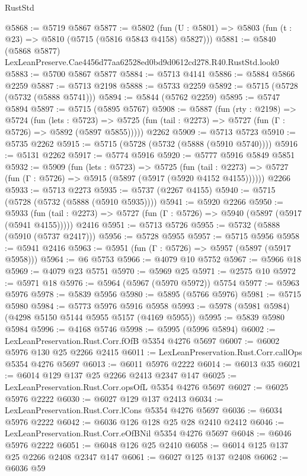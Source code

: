 \begin{lexlean}{RustStd}
\begin{coremodule}
@5868 := @5719 @5867
@5877 := @5802 (fun (U : @5801) => @5803 (fun (t : @23) => @5810 (@5715 (@5816 @5843 @4158) @5827)))
@5881 := @5840 (@5868 @5877) LexLeanPreserve.Cae4456d77aa62528ed0bd9d0612cd278.R40.RustStd.look0
@5883 := @5700 @5867 @5877
@5884 := @5713 @4141
@5886 := @5884 @5866 @2259
@5887 := @5713 @2198
@5888 := @5733 @2259
@5892 := @5715 (@5728 (@5732 (@5888 @5741)))
@5894 := @5844 (@5762 @2259)
@5895 := @5747 @5894
@5897 := @5715 (@5895 @5767)
@5908 := @5887
    (fun (rty : @2198) =>
    @5724
      (fun (lets : @5723) =>
      @5725 (fun (tail : @2273) => @5727 (fun (Γ : @5726) => @5892 (@5897 @5855)))))
    @2262
@5909 := @5713 @5723
@5910 := @5735 @2262
@5915 := @5715 (@5728 (@5732 (@5888 (@5910 @5740))))
@5916 := @5131 @2262
@5917 := @5774 @5916
@5920 := @5777 @5916 @5849 @5851
@5932 := @5909
    (fun (lets : @5723) =>
    @5725
      (fun (tail : @2273) => @5727 (fun (Γ : @5726) => @5915 (@5897 (@5917 (@5920 @4152 @4155))))))
    @2266
@5933 := @5713 @2273
@5935 := @5737 (@2267 @4155)
@5940 := @5715 (@5728 (@5732 (@5888 (@5910 @5935))))
@5941 := @5920 @2266
@5950 := @5933
    (fun (tail : @2273) => @5727 (fun (Γ : @5726) => @5940 (@5897 (@5917 (@5941 @4155)))))
    @2416
@5951 := @5713 @5726
@5955 := @5732 (@5888 (@5910 (@5737 @2417)))
@5956 := @5728 @5955
@5957 := @5715 @5956
@5958 := @5941 @2416
@5963 := @5951 (fun (Γ : @5726) => @5957 (@5897 (@5917 @5958)))
@5964 := @6 @5753
@5966 := @4079 @10 @5752
@5967 := @5966 @18
@5969 := @4079 @23 @5751
@5970 := @5969 @25
@5971 := @2575 @10
@5972 := @5971 @18
@5976 := @5964 (@5967 (@5970 @5972)) @5754
@5977 := @5963 @5976
@5978 := @5839 @5956
@5980 := @5895 (@5766 @5976)
@5981 := @5715 @5980
@5984 := @5773 @5976 @5916 @5958
@5993 := @5978 (@5981 @5984) (@4298 @5150 @5144 @5955 @5157 (@4169 @5955))
@5995 := @5839 @5980 @5984
@5996 := @4168 @5746
@5998 := @5995 (@5996 @5894)
@6002 := LexLeanPreservation.Rust.Corr.fOfB @5354 @4276 @5697
@6007 := @6002 @5976 @130 @25 @2266 @2415
@6011 := LexLeanPreservation.Rust.Corr.callOps @5354 @4276 @5697
@6013 := @6011 @5976 @2222
@6014 := @6013 @35
@6021 := @6014 @129 @137 @25 @2266 @2413 @2347 @147
@6025 := LexLeanPreservation.Rust.Corr.opsOfL @5354 @4276 @5697
@6027 := @6025 @5976 @2222
@6030 := @6027 @129 @137 @2413
@6034 := LexLeanPreservation.Rust.Corr.lCons @5354 @4276 @5697
@6036 := @6034 @5976 @2222
@6042 := @6036 @126 @128 @25 @28 @2410 @2412
@6046 := LexLeanPreservation.Rust.Corr.eOfBNil @5354 @4276 @5697
@6048 := @6046 @5976 @2222
@6051 := @6048 @126 @25 @2410
@6058 := @6014 @125 @137 @25 @2266 @2408 @2347 @147
@6061 := @6027 @125 @137 @2408
@6062 := @6036 @59

\end{coremodule}
\end{lexlean}
